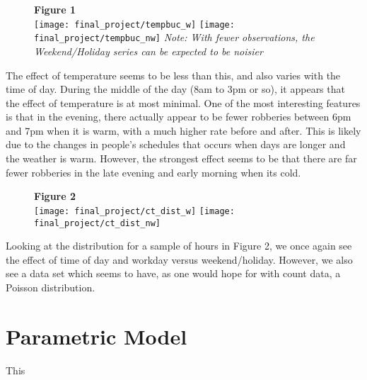 \documentclass[11pt]{article}
\theoremstyle{definition}
\begin{document}
\begin{figure}[h]
    {\bf Figure 1} \\
    \texttt{[image: final\_project/tempbuc\_w]}
    \texttt{[image: final\_project/tempbuc\_nw]}
    \textit{Note: With fewer observations, the Weekend/Holiday series can be expected to be noisier}
\end{figure}
The effect of temperature seems to be less than this, and also varies with the time of day. During the middle of the day (8am to 3pm or so), it appears that the effect of temperature is at most minimal. One of the most interesting features is that in the evening, there actually appear to be fewer robberies between 6pm and 7pm when it is warm, with a much higher rate before and after. This is likely due to the changes in people's schedules that occurs when days are longer and the weather is warm. However, the strongest effect seems to be that there are far fewer robberies in the late evening and early morning when its cold. \par
\begin{figure}[h]
    {\bf Figure 2} \\
    \texttt{[image: final\_project/ct\_dist\_w]}
    \texttt{[image: final\_project/ct\_dist\_nw]}
\end{figure}
Looking at the distribution for a sample of hours in Figure 2, we once again see the effect of time of day and workday versus weekend/holiday. However, we also see a data set which seems to have, as one would hope for with count data, a Poisson distribution.

\section{Parametric Model} 
This 
\end{document}
